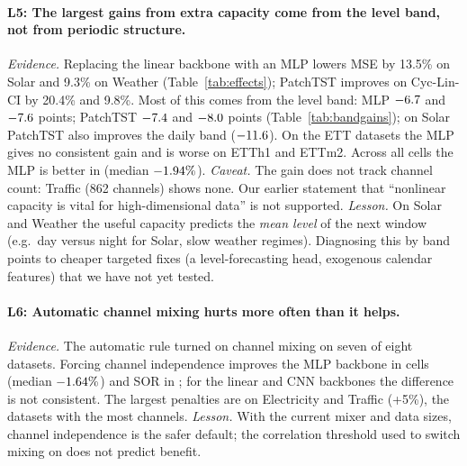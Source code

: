 \documentclass[11pt,a4paper]{article}
\newcommand{\lrn}[1]{\textbf{L#1}}
\begin{document}
\begin{table}[t]
\centering
\caption{Where gains come from: change in band MSE as a percentage of the reference model's total MSE (negative is better; the four bands sum to the total change). Cycle queue: Cyc-Lin-CI minus Linear; MLP residual: Cyc-MLP-CI minus Cyc-Lin-CI; PatchTST: minus Cyc-Lin-CI.}
\label{tab:bandgains}
\resizebox{\textwidth}{!}{}
\end{table}

\paragraph{\lrn{5}: The largest gains from extra capacity come from the level band, not from periodic structure.}
\emph{Evidence.} Replacing the linear backbone with an MLP lowers MSE by 13.5\% on Solar and 9.3\% on Weather (Table~\ref{tab:effects}); PatchTST improves on Cyc-Lin-CI by 20.4\% and 9.8\%. Most of this comes from the level band: MLP $-6.7$ and $-7.6$ points; PatchTST $-7.4$ and $-8.0$ points (Table~\ref{tab:bandgains}); on Solar PatchTST also improves the daily band ($-11.6$). On the ETT datasets the MLP gives no consistent gain and is worse on ETTh1 and ETTm2. Across all cells the MLP is better in \cmpCycMLPCIvsCycLinCIwins{} (median $-1.94\%$).
\emph{Caveat.} The gain does not track channel count: Traffic (862 channels) shows none. Our earlier statement that ``nonlinear capacity is vital for high-dimensional data'' is not supported.
\emph{Lesson.} On Solar and Weather the useful capacity predicts the \emph{mean level} of the next window (e.g.\ day versus night for Solar, slow weather regimes). Diagnosing this by band points to cheaper targeted fixes (a level-forecasting head, exogenous calendar features) that we have not yet tested.

\paragraph{\lrn{6}: Automatic channel mixing hurts more often than it helps.}
\emph{Evidence.} The automatic rule turned on channel mixing on seven of eight datasets. Forcing channel independence improves the MLP backbone in \cmpCycMLPCIvsCycMLPwins{} cells (median $-1.64\%$) and SOR in \cmpCycSORCIvsCycSORwins; for the linear and CNN backbones the difference is not consistent. The largest penalties are on Electricity and Traffic (+5\%), the datasets with the most channels.
\emph{Lesson.} With the current mixer and data sizes, channel independence is the safer default; the correlation threshold used to switch mixing on does not predict benefit.
\end{document}
